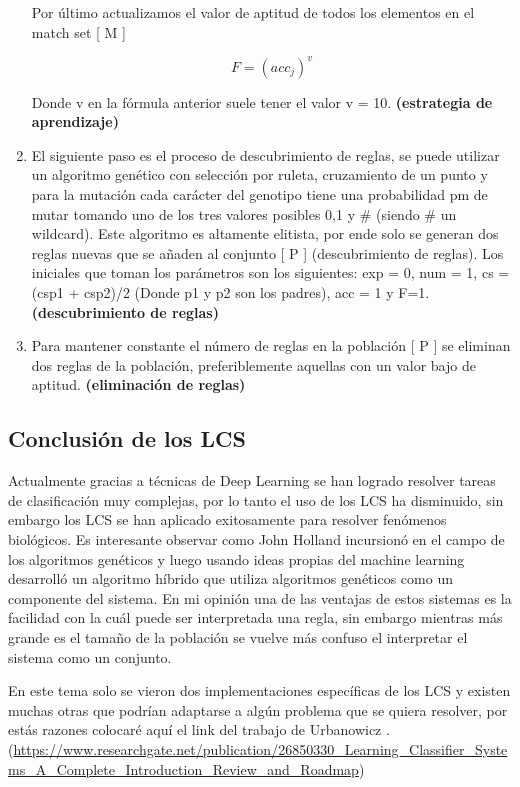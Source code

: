\documentclass[11pt,fleqn]{book} %
\begin{document}
\begin{enumerate}
Por último actualizamos el valor de aptitud de todos los elementos en el match set [ M ]

\begin{equation}
F=(acc_j)^{v}
\end{equation}

Donde v en la fórmula anterior suele tener el valor v = 10.
\textbf{(estrategia de aprendizaje)}
\item El siguiente paso es el proceso de descubrimiento de reglas, se puede utilizar un algoritmo genético con selección por ruleta, cruzamiento de un punto y para la mutación cada carácter del genotipo tiene una probabilidad pm de mutar tomando uno de los tres valores posibles 0,1 y \# (siendo \# un wildcard). Este algoritmo es altamente elitista, por ende solo se generan dos reglas nuevas que se añaden al conjunto [ P ] (descubrimiento de reglas). Los iniciales que toman los parámetros son los siguientes: exp = 0, num = 1, cs = (csp1 + csp2)/2 (Donde p1 y p2 son los padres), acc = 1 y  F=1. \textbf{(descubrimiento de reglas)}
\item Para mantener constante el número de reglas en la población [ P ] se eliminan dos reglas de la población, preferiblemente aquellas con un valor bajo de aptitud. \textbf{(eliminación de reglas)}
\end{enumerate}

\subsection{Conclusión de los LCS} 

Actualmente gracias a técnicas de Deep Learning se han logrado resolver tareas de clasificación muy complejas, por lo tanto el uso de los LCS ha disminuido, sin embargo los LCS se han aplicado exitosamente para resolver fenómenos biológicos. Es interesante observar como John Holland incursionó en el campo de los algoritmos genéticos y luego usando ideas propias del machine learning desarrolló un algoritmo híbrido que utiliza algoritmos genéticos como un componente del sistema. En mi opinión una de las ventajas de estos sistemas es la facilidad con la cuál puede ser interpretada una regla, sin embargo mientras más grande es el tamaño de la población se vuelve más confuso el interpretar el sistema como un conjunto.

En este tema solo se vieron dos implementaciones específicas de los LCS y existen muchas otras que podrían adaptarse a algún problema que se quiera resolver, por estás razones colocaré aquí el link del trabajo de Urbanowicz \cite{UrbanowiczLCS}. (\url{https://www.researchgate.net/publication/26850330_Learning_Classifier_Systems_A_Complete_Introduction_Review_and_Roadmap})
\end{document}
